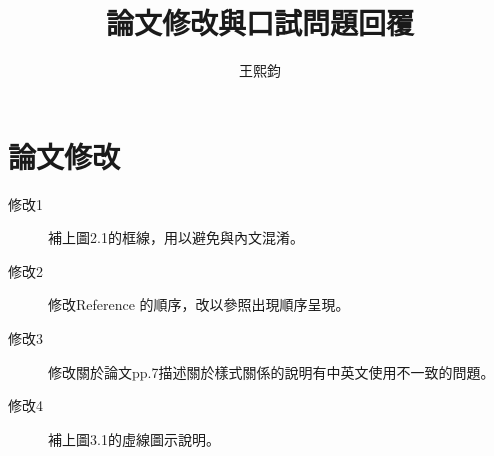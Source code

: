\documentclass[12pt]{article}
\title{論文修改與口試問題回覆}
\author{王熙鈞}
\begin{document}
\maketitle



\section{論文修改}
\begin{description}
\item[修改1] 補上圖2.1的框線，用以避免與內文混淆。
\item[修改2] 修改Reference 的順序，改以參照出現順序呈現。
\item[修改3] 修改關於論文pp.7描述關於樣式關係的說明有中英文使用不一致的問題。
\item[修改4] 補上圖3.1的虛線圖示說明。
\end{description}
\end{document}
